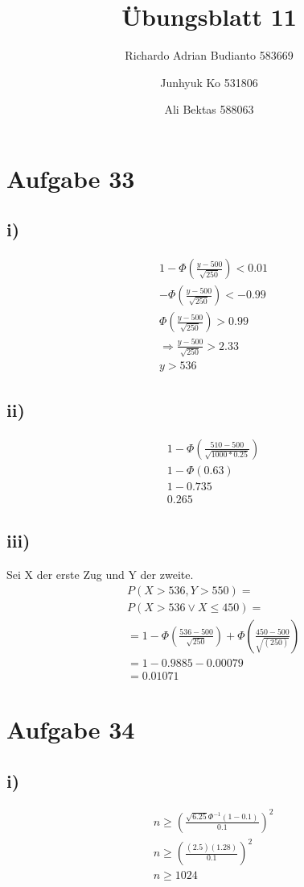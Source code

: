 \documentclass{article}
\title{Übungsblatt 11}
\author{Richardo Adrian Budianto  583669 \and Junhyuk Ko  531806 \and Ali Bektas 588063 }
\begin{document}
	
	\maketitle
	\section*{Aufgabe 33}
		\subsection*{i)}
			\begin{align*}
				&1-\Phi(\frac{y-500}{\sqrt{250}}) < 0.01\\
				&-\Phi(\frac{y-500}{\sqrt{250}}) < -0.99\\
				&\Phi(\frac{y-500}{\sqrt{250}}) > 0.99\\
				&\Rightarrow \frac{y-500}{\sqrt{250}} > 2.33\\
				&y>536
			\end{align*}
		\subsection*{ii)}
			\begin{align*}
				&1-\Phi(\frac{510-500}{\sqrt{1000*0.25}})\\
				&1-\Phi(0.63)\\
				&1-0.735\\
				&0.265
			\end{align*}
		\subsection*{iii)}
			Sei X der erste Zug und Y der zweite.
			\begin{align*}
				&P(X>536 , Y>550)=\\
				&P(X>536 \lor X \leq 450)=\\
				&=1-\Phi(\frac{536-500}{\sqrt{250}})+\Phi(\frac{450-500}{\sqrt{(250)}})\\
				&=1-0.9885-0.00079\\
				&=0.01071
			\end{align*}
	\section*{Aufgabe 34}
		\subsection*{i)}
			\begin{align*}
				&n \geq (\frac{\sqrt{6.25}\Phi^{-1}(1-0.1)}{0.1})^2\\
				&n \geq (\frac{(2.5)(1.28)}{0.1})^2\\
				&n \geq 1024
			\end{align*}
\end{document}

